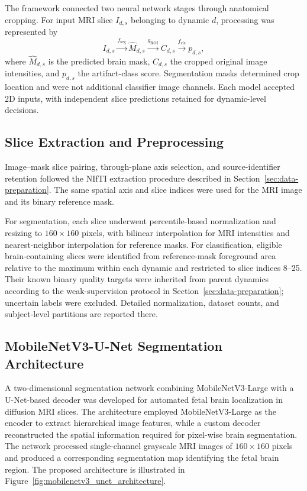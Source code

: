 The framework connected two neural network stages through anatomical cropping. For input MRI slice $I_{d,s}$ belonging to dynamic $d$, processing was represented by
\begin{equation}
I_{d,s}\xrightarrow{f_{\mathrm{seg}}}\hat M_{d,s}
\xrightarrow{g_{\mathrm{ROI}}}C_{d,s}
\xrightarrow{f_{\mathrm{cls}}}p_{d,s},
\end{equation}
where $\hat M_{d,s}$ is the predicted brain mask, $C_{d,s}$ the cropped original image intensities, and $p_{d,s}$ the artifact-class score. Segmentation masks determined crop location and were not additional classifier image channels. Each model accepted 2D inputs, with independent slice predictions retained for dynamic-level decisions.

\subsection{Slice Extraction and Preprocessing}
\label{subsec:2d_slice_preprocessing}

\label{subsubsec:2d-normalization}
\label{subsubsec:artifact-labeling}

Image--mask slice pairing, through-plane axis selection, and source-identifier retention followed the NIfTI extraction procedure described in Section~\ref{sec:data-preparation}. The same spatial axis and slice indices were used for the MRI image and its binary reference mask.

For segmentation, each slice underwent percentile-based normalization and resizing to $160\times160$ pixels, with bilinear interpolation for MRI intensities and nearest-neighbor interpolation for reference masks. For classification, eligible brain-containing slices were identified from reference-mask foreground area relative to the maximum within each dynamic and restricted to slice indices 8--25. Their known binary quality targets were inherited from parent dynamics according to the weak-supervision protocol in Section~\ref{sec:data-preparation}; uncertain labels were excluded. Detailed normalization, dataset counts, and subject-level partitions are reported there.

\subsection{MobileNetV3-U-Net Segmentation Architecture}
\label{subsec:2d_mobilenet_architecture}

A two-dimensional segmentation network combining MobileNetV3-Large with a U-Net-based decoder was developed for automated fetal brain localization in diffusion MRI slices. The architecture employed MobileNetV3-Large as the encoder to extract hierarchical image features, while a custom decoder reconstructed the spatial information required for pixel-wise brain segmentation. The network processed single-channel grayscale MRI images of $160 \times 160$ pixels and produced a corresponding segmentation map identifying the fetal brain region. The proposed architecture is illustrated in Figure~\ref{fig:mobilenetv3_unet_architecture}.

